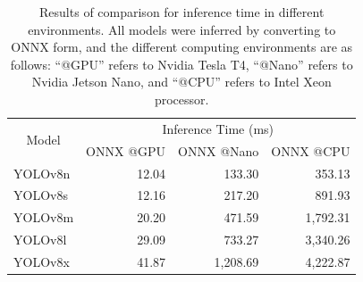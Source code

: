 \begin{table}[!h]
    \caption{Results of comparison for inference time in different environments. All models were inferred by converting to ONNX form, and the different computing environments are as follows: ``@GPU'' refers to Nvidia Tesla T4, ``@Nano'' refers to Nvidia Jetson Nano, and ``@CPU'' refers to Intel Xeon processor.}
    \label{tab:inference}
    \begin{tabular}{lrrr}
    \toprule
    \multicolumn{1}{c}{\multirow{2}{*}{Model}}   & \multicolumn{3}{c}{Inference Time (ms)} \\
                                 & ONNX @GPU & ONNX @Nano & ONNX @CPU \\
    \midrule
    YOLOv8n & 12.04        & 133.30            & 353.13    \\
    YOLOv8s & 12.16        & 217.20            & 891.93    \\
    YOLOv8m & 20.20        & 471.59            & 1,792.31   \\
    YOLOv8l & 29.09       & 733.27            & 3,340.26   \\
    YOLOv8x & 41.87       & 1,208.69           & 4,222.87  \\
    \bottomrule
    \end{tabular}%
\end{table}


